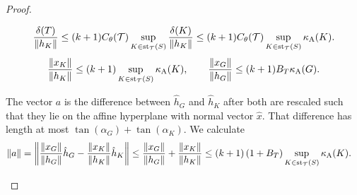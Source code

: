 \documentclass[10pt,a4paper]{article}
\begin{document}
\begin{proof}
\begin{itemize}
\begin{align*}
            \frac{ \diam(T) }{ \| h_{K} \| }
            \leq 
            (k+1)
            \diameterratio(\calT)
            \sup_{ K \in \patch_{\calT}(S) }
            \frac{ \diam(K) }{ \| h_{K} \| }
            \leq 
            (k+1)
            \diameterratio(\calT)
            \sup_{ K \in \patch_{\calT}(S) }
            \aspectratio(K) %
            .
        \end{align*}
        \begin{gather*}
            \frac{ \| x_{K} \| }{ \| h_{{K}} \| }
            \leq 
            (k+1)
            \sup_{ K \in \patch_{\calT}(S) }
            \aspectratio(K) %
            ,
            \qquad 
            \frac{ \| x_{G} \| }{ \| h_{G} \| }
            \leq 
            (k+1)B_{T}
            \aspectratio({G}) %
            .
        \end{gather*}

        
        
        The vector $a$ is the difference between $\hat h_{G}$ and $\hat h_{K}$ after both are rescaled such that they lie on the affine hyperplane with normal vector $\hat x$. That difference has length at most $\tan(\alpha_{G}) + \tan(\alpha_{K})$.
        We calculate 
        \begin{align*}
            \|a\|
            = 
            \left\|
            \frac{\|x_{G}\|}{\|h_{G}\|} \hat h_{{G}} 
            - 
            \frac{\|x_{K}\|}{\|h_{K}\|} \hat h_K
            \right\|
            &
            \leq 
            \frac{\|x_{G}\|}{\|h_{G}\|} 
            + 
            \frac{\|x_{K}\|}{\|h_{K}\|} 
            \leq 
            (k+1) 
            \left( 1 + B_{T} \right)
            \sup_{ K \in \patch_{\calT}(S) }
            \aspectratio(K) %
            .
        \end{align*}
        

\end{itemize}
\end{proof}
\end{document}
